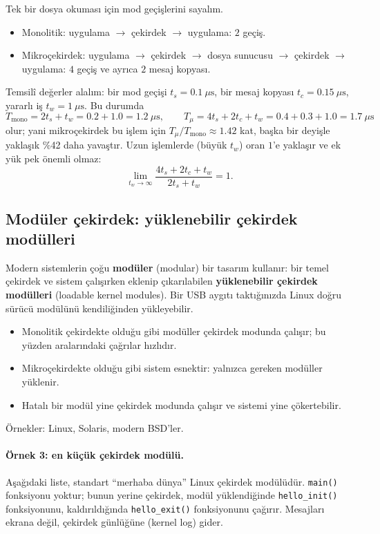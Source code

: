 \documentclass[11pt,a4paper]{article}
\newcommand{\term}[1]{\textbf{\color{mintdeep}#1}}
\newcommand{\cmd}[1]{\texttt{#1}}
\begin{document}
\begin{example}
Tek bir dosya okuması için mod geçişlerini sayalım.
\begin{itemize}
  \item Monolitik: uygulama $\to$ çekirdek $\to$ uygulama: $2$ geçiş.
  \item Mikroçekirdek: uygulama $\to$ çekirdek $\to$ dosya sunucusu $\to$ çekirdek $\to$ uygulama: $4$ geçiş ve ayrıca $2$ mesaj kopyası.
\end{itemize}
Temsilî değerler alalım: bir mod geçişi $t_{s} = 0.1\ \mu\text{s}$, bir mesaj kopyası $t_{c} = 0.15\ \mu\text{s}$, yararlı iş $t_{w} = 1\ \mu\text{s}$. Bu durumda
\[
T_{\text{mono}} = 2t_{s} + t_{w} = 0.2 + 1.0 = 1.2\ \mu\text{s},
\qquad
T_{\mu} = 4t_{s} + 2t_{c} + t_{w} = 0.4 + 0.3 + 1.0 = 1.7\ \mu\text{s}
\]
olur; yani mikroçekirdek bu işlem için $T_{\mu}/T_{\text{mono}} \approx 1.42$ kat, başka bir deyişle yaklaşık \%42 daha yavaştır. Uzun işlemlerde (büyük $t_{w}$) oran $1$'e yaklaşır ve ek yük pek önemli olmaz:
\[
\lim_{t_{w}\to\infty} \frac{4t_{s} + 2t_{c} + t_{w}}{2t_{s} + t_{w}} = 1 .
\]
\end{example}

\subsection{Modüler çekirdek: yüklenebilir çekirdek modülleri}

Modern sistemlerin çoğu \term{modüler} (modular) bir tasarım kullanır: bir temel çekirdek ve sistem çalışırken eklenip çıkarılabilen \term{yüklenebilir çekirdek modülleri} (loadable kernel modules). Bir USB aygıtı taktığınızda Linux doğru sürücü modülünü kendiliğinden yükleyebilir.

\begin{itemize}
  \item[\textcolor{mintdeep}{$+$}] Monolitik çekirdekte olduğu gibi modüller çekirdek modunda çalışır; bu yüzden aralarındaki çağrılar hızlıdır.
  \item[\textcolor{mintdeep}{$+$}] Mikroçekirdekte olduğu gibi sistem esnektir: yalnızca gereken modüller yüklenir.
  \item[\textcolor{red!60!black}{$-$}] Hatalı bir modül yine çekirdek modunda çalışır ve sistemi yine çökertebilir.
\end{itemize}
Örnekler: Linux, Solaris, modern BSD'ler.

\paragraph{Örnek 3: en küçük çekirdek modülü.} Aşağıdaki liste, standart ``merhaba dünya'' Linux çekirdek modülüdür. \cmd{main()} fonksiyonu yoktur; bunun yerine çekirdek, modül yüklendiğinde \cmd{hello\_init()} fonksiyonunu, kaldırıldığında \cmd{hello\_exit()} fonksiyonunu çağırır. Mesajları ekrana değil, çekirdek günlüğüne (kernel log) gider.
\end{document}
